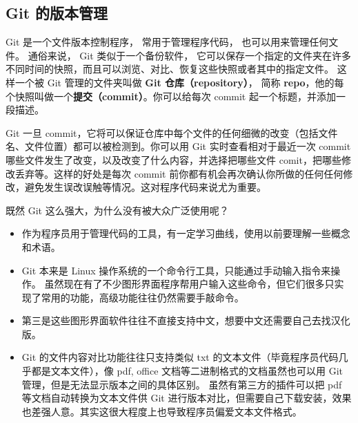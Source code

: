 
\begin{issues}
\issueTODO
\end{issues}

\subsection{Git 的版本管理}
Git 是一个文件版本控制程序， 常用于管理程序代码， 也可以用来管理任何文件。 通俗来说， Git 类似于一个备份软件， 它可以保存一个指定的文件夹在许多不同时间的快照，而且可以浏览、对比、恢复这些快照或者其中的指定文件。 这样一个被 Git 管理的文件夹叫做 \textbf{Git 仓库（repository）}， 简称 \textbf{repo}，他的每个快照叫做一个\textbf{提交（commit）}。你可以给每次 commit 起一个标题，并添加一段描述。


Git 一旦 commit，它将可以保证仓库中每个文件的任何细微的改变（包括文件名、文件位置）都可以被检测到。你可以用 Git 实时查看相对于最近一次 commit 哪些文件发生了改变，以及改变了什么内容，并选择把哪些文件 comit，把哪些修改丢弃等。这样的好处是每次 commit 前你都有机会再次确认你所做的任何任何修改，避免发生误改误触等情况。这对程序代码来说尤为重要。

既然 Git 这么强大，为什么没有被大众广泛使用呢？
\begin{itemize}
\item 作为程序员用于管理代码的工具，有一定学习曲线，使用以前要理解一些概念和术语。
\item Git 本来是 Linux 操作系统的一个命令行工具，只能通过手动输入指令来操作。 虽然现在有了不少图形界面程序帮用户输入这些命令，但它们很多只实现了常用的功能，高级功能往往仍然需要手敲命令。
\item 第三是这些图形界面软件往往不直接支持中文，想要中文还需要自己去找汉化版。
\item Git 的文件内容对比功能往往只支持类似 txt 的文本文件（毕竟程序员代码几乎都是文本文件），像 pdf, office 文档等二进制格式的文档虽然也可以用 Git 管理，但是无法显示版本之间的具体区别。 虽然有第三方的插件可以把 pdf 等文档自动转换为文本文件供 Git 进行版本对比，但需要自己下载安装，效果也差强人意。其实这很大程度上也导致程序员偏爱文本文件格式。
\end{itemize}

